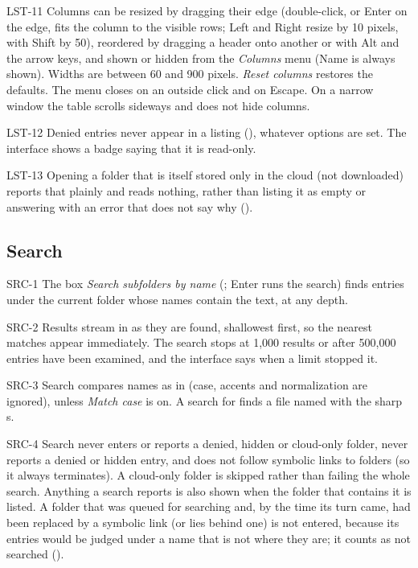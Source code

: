 \begin{req}{LST-11}
Columns can be resized by dragging their edge (double-click, or Enter on the edge,
fits the column to the visible rows; Left and Right resize by 10 pixels, with Shift
by 50), reordered by dragging a header onto another or with Alt and the arrow keys,
and shown or hidden from the \emph{Columns} menu (Name is always shown).  Widths are
between 60 and 900 pixels.  \emph{Reset columns} restores the defaults.  The menu
closes on an outside click and on Escape.  On a narrow window the table scrolls
sideways and does not hide columns.
\end{req}

\begin{req}{LST-12}
Denied entries never appear in a listing (), whatever options are set.
The interface shows a badge saying that it is read-only.
\end{req}

\begin{req}{LST-13}
Opening a folder that is itself stored only in the cloud (not downloaded) reports that
plainly and reads nothing, rather than listing it as empty or answering with an error
that does not say why ().
\end{req}

\subsection{Search}

\begin{req}{SRC-1}
The box \emph{Search subfolders by name} (; Enter runs the search)
finds entries under the current folder whose names contain the text, at any depth.
\end{req}

\begin{req}{SRC-2}
Results stream in as they are found, shallowest first, so the nearest matches
appear immediately.  The search stops at 1{,}000 results or after 500{,}000 entries
have been examined, and the interface says when a limit stopped it.
\end{req}

\begin{req}{SRC-3}
Search compares names as in  (case, accents and normalization are
ignored), unless \emph{Match case} is on.  A search for  finds a file
named with the sharp s.
\end{req}

\begin{req}{SRC-4}
Search never enters or reports a denied, hidden or cloud-only folder, never reports a
denied or hidden entry, and does not follow symbolic links to folders (so it always
terminates).  A cloud-only folder is skipped rather than failing the whole search.
Anything a search reports is also shown when the folder that contains it is listed.
A folder that was queued for searching and, by the time its turn came, had been
replaced by a symbolic link (or lies behind one) is not entered, because its entries
would be judged under a name that is not where they are; it counts as not searched
().
\end{req}

